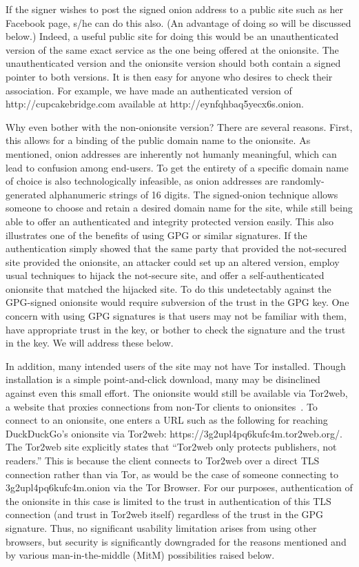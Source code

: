 \documentclass[10pt, conference, compsocconf]{styles/IEEEtran}
\begin{document}
If the signer wishes to post the signed onion address to a public
site such as her Facebook page, s/he can do this also. (An advantage
of doing so will be discussed below.) Indeed, a
useful public site for doing this would be an unauthenticated version
of the same exact service as the one being offered at the onionsite.
The unauthenticated version and the onionsite version should both
contain a signed pointer to both versions. It is then
easy for anyone who desires to check their association.
For example, we have made an authenticated version of
http://cupcakebridge.com available at http://eynfqhbaq5yecx6s.onion.

Why even bother with the non-onionsite version? There
are several reasons. First, this allows for a binding of the public
domain name to the onionsite. As mentioned, onion addresses are
inherently not humanly meaningful, which can lead to confusion among 
end-users.  To get the entirety of a specific domain name of choice is
also technologically infeasible, as onion addresses are
randomly-generated alphanumeric strings of 16 digits. The signed-onion
technique allows someone to choose and retain a desired domain name for the
site, while still being able to offer an authenticated and integrity
protected version easily. This also illustrates one of the benefits
of using GPG or similar signatures. If the authentication simply
showed that the same party that provided the not-secured site
provided the onionsite, an attacker could set up an altered version,
employ usual techniques to hijack the not-secure site, and offer
a self-authenticated onionsite that matched the hijacked site.
To do this undetectably against the GPG-signed onionsite would require
subversion of the trust in the GPG key. One concern with using GPG signatures
is that users may not be familiar with them,
have appropriate trust in the key, or bother to check the signature
and the trust in the key. We will address these below.

In addition, many intended users of the site may not have Tor installed.
Though installation is a simple point-and-click download, many may be
disinclined against even this small effort. The onionsite would still
be available via Tor2web, a website that proxies connections from
non-Tor clients to onionsites~\cite{tor2web}.  To connect to an onionsite,
one enters a URL such as the following for reaching
DuckDuckGo's onionsite via Tor2web:
https://3g2upl4pq6kufc4m.tor2web.org/. The Tor2web site explicitly
states that ``Tor2web only protects publishers, not readers.'' This is
because the client connects to Tor2web over a direct TLS connection
rather than via Tor, as would be the case of someone connecting to
3g2upl4pq6kufc4m.onion via the Tor Browser.  For our purposes,
authentication of the onionsite in this case is limited to the trust
in authentication of this TLS connection (and trust in Tor2web itself)
regardless of the trust in the GPG signature. Thus, no significant
usability limitation arises from using other browsers, but security
is significantly downgraded for the reasons mentioned and by various
man-in-the-middle (MitM) possibilities raised below.
\end{document}
